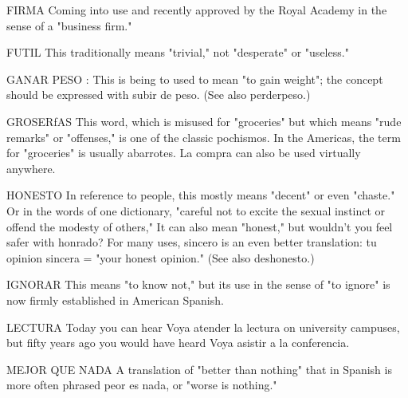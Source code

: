 FIRMA Coming into use and recently approved by the Royal
Academy in the sense of a "business firm."

FUTIL This traditionally means "trivial," not "desperate" or
"useless."

GANAR PESO : This is being to used to mean "to gain
weight"; the concept should be expressed with subir de peso. (See
also perderpeso.)

GROSERfAS This word, which is misused for "groceries" but
which means "rude remarks" or "offenses," is one of the classic pochismos. In the Americas, the term for "groceries" is usually abarrotes. La compra can also be used virtually anywhere.

HONESTO In reference to people, this mostly means "decent"
or even "chaste." Or in the words of one dictionary, "careful not to excite the sexual instinct or offend the modesty of others," It can also
mean "honest," but wouldn't you feel safer with honrado? For many
uses, sincero is an even better translation: tu opinion sincera = "your
honest opinion." (See also deshonesto.)

IGNORAR This means "to know not," but its use in the sense
of "to ignore" is now firmly established in American Spanish.

LECTURA Today you can hear Voya atender la lectura on
university campuses, but fifty years ago you would have heard Voya
asistir a la conferencia.

MEJOR QUE NADA A translation of "better than nothing"
that in Spanish is more often phrased peor es nada, or "worse is
nothing."

